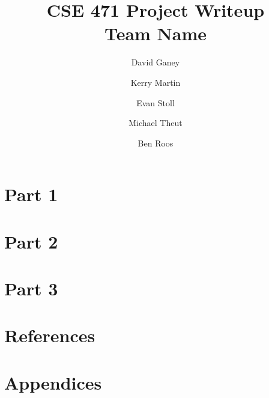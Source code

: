 \documentclass[12pt]{article}
\begin{document}
\begin{spacing}{.4}
\setlength{\droptitle}{-7em}
\title{CSE 471 Project Writeup \\ Team Name}
\author{David Ganey \and Kerry Martin \and Evan Stoll \and Michael Theut \and Ben Roos}
\maketitle
\newpage
\end{spacing}

\begin{spacing}{1.5}

\tableofcontents

\section{Part 1}
\section{Part 2}
\section{Part 3}
\section{References}
\section{Appendices}

\end{spacing}
\end{document}
